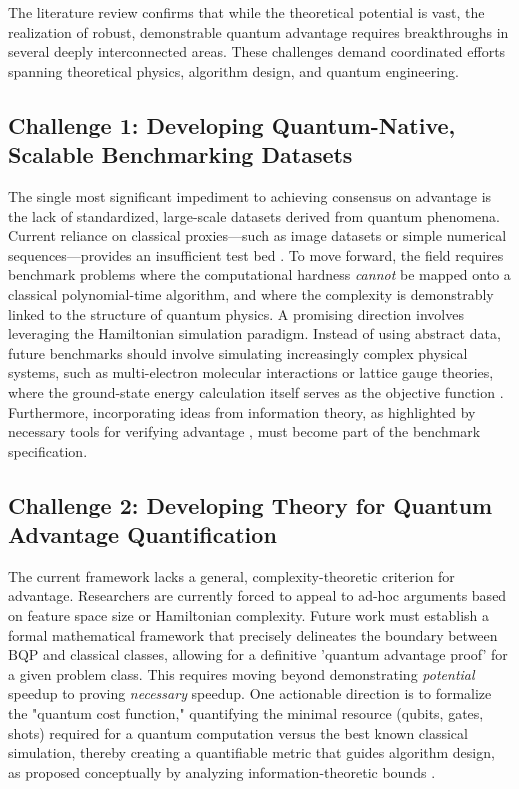 \documentclass{article}
\begin{document}
\label{sec:open\_challenges\_and\_future\_directions}

The literature review confirms that while the theoretical potential is vast, the realization of robust, demonstrable quantum advantage requires breakthroughs in several deeply interconnected areas. These challenges demand coordinated efforts spanning theoretical physics, algorithm design, and quantum engineering.

\subsection{Challenge 1: Developing Quantum-Native, Scalable Benchmarking Datasets}

\label{sec:challenge_1\_developing\_quantum\_native\_sc}

The single most significant impediment to achieving consensus on advantage is the lack of standardized, large-scale datasets derived from quantum phenomena. Current reliance on classical proxies---such as image datasets or simple numerical sequences---provides an insufficient test bed \cite{cerezo2022challenges}. To move forward, the field requires benchmark problems where the computational hardness \textit{cannot} be mapped onto a classical polynomial-time algorithm, and where the complexity is demonstrably linked to the structure of quantum physics. A promising direction involves leveraging the Hamiltonian simulation paradigm. Instead of using abstract data, future benchmarks should involve simulating increasingly complex physical systems, such as multi-electron molecular interactions or lattice gauge theories, where the ground-state energy calculation itself serves as the objective function \cite{barca2020recent}. Furthermore, incorporating ideas from information theory, as highlighted by necessary tools for verifying advantage \cite{liu2024verifying}, must become part of the benchmark specification.

\subsection{Challenge 2: Developing Theory for Quantum Advantage Quantification}

\label{sec:challenge_2\_developing\_theory\_for\_quantu}

The current framework lacks a general, complexity-theoretic criterion for advantage. Researchers are currently forced to appeal to ad-hoc arguments based on feature space size or Hamiltonian complexity. Future work must establish a formal mathematical framework that precisely delineates the boundary between $\text{BQP}$ and classical classes, allowing for a definitive 'quantum advantage proof' for a given problem class. This requires moving beyond demonstrating \textit{potential} speedup to proving \textit{necessary} speedup. One actionable direction is to formalize the "quantum cost function," quantifying the minimal resource (qubits, gates, shots) required for a quantum computation versus the best known classical simulation, thereby creating a quantifiable metric that guides algorithm design, as proposed conceptually by analyzing information-theoretic bounds \cite{huang2021informationtheoretic}.
\end{document}
